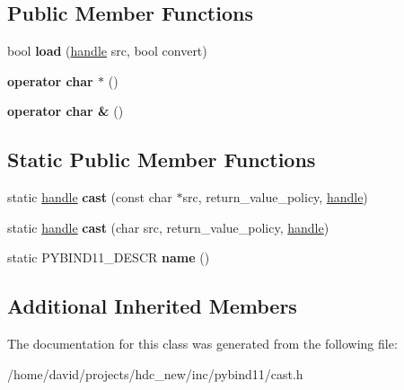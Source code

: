 \subsection*{Public Member Functions}
\begin{DoxyCompactItemize}
\item 
bool {\bfseries load} (\hyperlink{classhandle}{handle} src, bool convert)\hypertarget{classtype__caster_3_01char_01_4_ad6fd1b5cc291746e279ef7ee8c4e68eb}{}\label{classtype__caster_3_01char_01_4_ad6fd1b5cc291746e279ef7ee8c4e68eb}

\item 
{\bfseries operator char $\ast$} ()\hypertarget{classtype__caster_3_01char_01_4_a14f265430d51d34438721d328820f140}{}\label{classtype__caster_3_01char_01_4_a14f265430d51d34438721d328820f140}

\item 
{\bfseries operator char \&} ()\hypertarget{classtype__caster_3_01char_01_4_af6509f73c3087cb2118092d02bdf43ee}{}\label{classtype__caster_3_01char_01_4_af6509f73c3087cb2118092d02bdf43ee}

\end{DoxyCompactItemize}
\subsection*{Static Public Member Functions}
\begin{DoxyCompactItemize}
\item 
static \hyperlink{classhandle}{handle} {\bfseries cast} (const char $\ast$src, return\+\_\+value\+\_\+policy, \hyperlink{classhandle}{handle})\hypertarget{classtype__caster_3_01char_01_4_acdf18cb54671400b338a3148dcb5a105}{}\label{classtype__caster_3_01char_01_4_acdf18cb54671400b338a3148dcb5a105}

\item 
static \hyperlink{classhandle}{handle} {\bfseries cast} (char src, return\+\_\+value\+\_\+policy, \hyperlink{classhandle}{handle})\hypertarget{classtype__caster_3_01char_01_4_ad25504c93673faceca6e16ab35b3f3f1}{}\label{classtype__caster_3_01char_01_4_ad25504c93673faceca6e16ab35b3f3f1}

\item 
static P\+Y\+B\+I\+N\+D11\+\_\+\+D\+E\+S\+CR {\bfseries name} ()\hypertarget{classtype__caster_3_01char_01_4_a77b6d4eb1333bcf747c053b35450018e}{}\label{classtype__caster_3_01char_01_4_a77b6d4eb1333bcf747c053b35450018e}

\end{DoxyCompactItemize}
\subsection*{Additional Inherited Members}


The documentation for this class was generated from the following file\+:\begin{DoxyCompactItemize}
\item 
/home/david/projects/hdc\+\_\+new/inc/pybind11/cast.\+h\end{DoxyCompactItemize}
